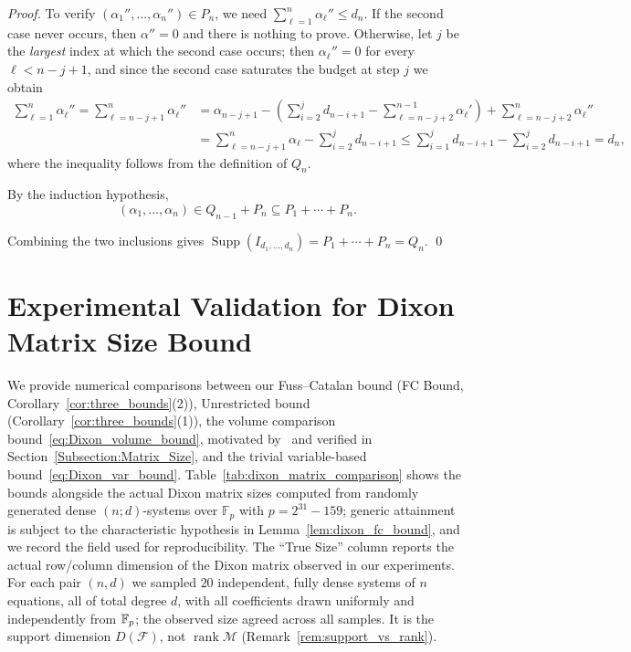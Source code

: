 \begin{proof}
	To verify $(\alpha_1'', \ldots, \alpha_n'') \in P_n$, we need $\sum_{\ell=1}^{n} \alpha_\ell'' \leq d_n$. If the second case never occurs, then $\alpha''=0$ and there is nothing to prove. Otherwise, let $j$ be the \emph{largest} index at which the second case occurs; then $\alpha_\ell''=0$ for every $\ell<n-j+1$, and since the second case saturates the budget at step $j$ we obtain
	\begin{align*}
		\sum_{\ell=1}^{n} \alpha_\ell''=\sum_{\ell=n-j+1}^{n} \alpha_\ell''
		&= \alpha_{n-j+1} -\!\left(\sum_{i=2}^{j} d_{n-i+1} - \sum_{\ell=n-j+2}^{n-1} \alpha_\ell'\right)\!+\!\sum_{\ell=n-j+2}^{n} \alpha_\ell'' \\[0.3em]
		&= \sum_{\ell=n-j+1}^{n} \alpha_\ell\!-\!\sum_{i=2}^{j} d_{n-i+1}
		\leq \sum_{i=1}^{j} d_{n-i+1}\!-\!\sum_{i=2}^{j} d_{n-i+1}
		= d_n,
	\end{align*}
	where the inequality follows from the definition of $Q_n$.
	
	By the induction hypothesis,
	\begin{equation*}
		(\alpha_1, \ldots, \alpha_n) \in Q_{n-1} + P_n \subseteq P_1 + \cdots + P_n.
	\end{equation*}
	
Combining the two inclusions gives $\operatorname{Supp}(I_{d_1,\ldots,d_n})=P_1+\cdots+P_n=Q_n$.
    \qed
\end{proof}


\newpage
\section{Experimental Validation for Dixon Matrix Size Bound}\label{appendix:experimental_bound}

We provide numerical comparisons between our Fuss--Catalan bound (FC Bound, Corollary~\ref{cor:three_bounds}(2)), Unrestricted bound (Corollary~\ref{cor:three_bounds}(1)), the volume comparison bound~\eqref{eq:Dixon_volume_bound}, motivated by~\cite[Theorem~4.3]{DBLP:conf/stoc/KapurS96} and verified in Section~\ref{Subsection:Matrix_Size}, and the trivial variable-based bound~\eqref{eq:Dixon_var_bound}. Table~\ref{tab:dixon_matrix_comparison} shows the bounds alongside the actual Dixon matrix sizes computed from randomly generated dense $(n;d)$-systems over $\mathbb{F}_p$ with $p=2^{31}-159$; generic attainment is subject to the characteristic hypothesis in Lemma~\ref{lem:dixon_fc_bound}, and we record the field used for reproducibility. The ``True Size'' column reports the actual row/column dimension of the Dixon matrix observed in our experiments. For each pair $(n,d)$ we sampled $20$ independent, fully dense systems of $n$ equations, all of total degree $d$, with all coefficients drawn uniformly and independently from $\mathbb{F}_p$; the observed size agreed across all samples. It is the support dimension $D(\mathcal{F})$, not $\operatorname{rank}\mathcal{M}$ (Remark~\ref{rem:support_vs_rank}).

